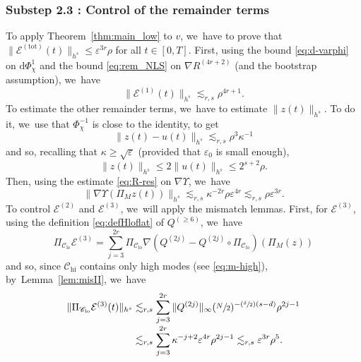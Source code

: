 \documentclass[10pt,a4paper]{amsart}
\newcommand{\Psfrac}[2]{(\sfrac{#1}{#2})}
\theoremstyle{plain}
\theoremstyle{definition}
\DeclareMathOperator{\hi}{hi}
\DeclareMathOperator{\lo}{lo}
\newcommand{\1}{\mathbf{1}}
\newcommand{\Clo}{\mathscr{C}_{\lo}}
\newcommand{\Chigh}{\mathscr{C}_{\hi}}
\begin{document}
\subsubsection*{Substep 2.3 : Control of the remainder terms}
To apply Theorem~\ref{thm:main_low} to $v$, we~have to prove that $\| \mathcal{E}^{\mathrm{(tot)}}(t) \|_{h^s} \leq \varepsilon^{3r} \rho $ for all $t\in [0,T]$.
First, using the bound \eqref{eq:d-varphi} on $\mathrm{d}\Phi_\chi^1$ and the bound \eqref{eq:rem_NLS} on $\nabla R^{(4r+2)}$ (and the bootstrap assumption), we~have\vspace*{-3pt}
\begin{equation}
\label{eq:estE1}
\| \mathcal{E}^{(1)}(t) \|_{h^s} \lesssim_{r,s} \rho^{4r+1}.
\end{equation}
To estimate the other remainder terms, we~have to estimate $\| z(t) \|_{h^s}$. To do it, we~use that $\Phi_\chi^{-1}$ is close to the identity, to get\vspace*{-3pt}
\begin{equation}
\label{eq:z_close_to_u}
\| z(t) - u(t) \|_{h^s} \lesssim_{r,s} \rho^3 \kappa^{-1}
\end{equation}
and so, recalling that $\kappa \geq \sqrt{\varepsilon}$ (provided that $\varepsilon_0$ is small enough),\vspace*{-3pt}
\[
\| z(t) \|_{h^s} \leq 2 \| u(t) \|_{h^s} \leq 2^{s+2} \rho.
\]
Then, using the estimate
\eqref{eq:R-res}
on $\nabla \Upsilon$, we~have\vspace*{-3pt}
\begin{equation}
\label{eq:estups}
\| \nabla \Upsilon(\Pi_M z(t))\|_{h^s} \lesssim_{r,s} \kappa^{-2r} \rho \varepsilon^{4r} \lesssim_{r,s} \rho \varepsilon^{3r}.
\end{equation}
To control $\mathcal{E}^{(2)}$ and $\mathcal{E}^{(3)}$, we~will apply the mismatch lemmas. First, for $\mathcal{E}^{(3)}$, using the definition \eqref{eq:defHloflat} of $Q^{(\geq 6)}$, we~have\vspace*{-3pt}
\[
\Pi_{\Clo} \mathcal{E}^{(3)} = \sum_{j = 3}^{2r} \Pi_{\Clo} \nabla (Q^{(2j)} - Q^{(2j)} \circ \Pi_{\Clo})(\Pi_M(z))
\]
and so, since $\Chigh$ contains only high modes (see \eqref{eq:m-high}), by~Lemma~\ref{lem:misII}, we~have\vspace*{-3pt}
\begin{equation}
\label{eq:estE3}
\begin{split}
\|\Pi_{\Clo} \mathcal{E}^{(3)} (t)\|_{h^{s}} &\lesssim_{r,s} \sum_{j = 3}^{2r} \| Q^{(2j)}\|_{\infty}(\sfrac{N}2)^{-\Psfrac{\delta}{2}(s-d)} \rho^{2j-1}\\[
-3pt]
&\lesssim_{r,s} \sum_{j = 3}^{2r} \kappa^{-j+2} \varepsilon^{4r} \rho^{2j-1} \lesssim_{r,s} \varepsilon^{3r} \rho^{5}.
\end{split}
\end{equation}
\end{document}
